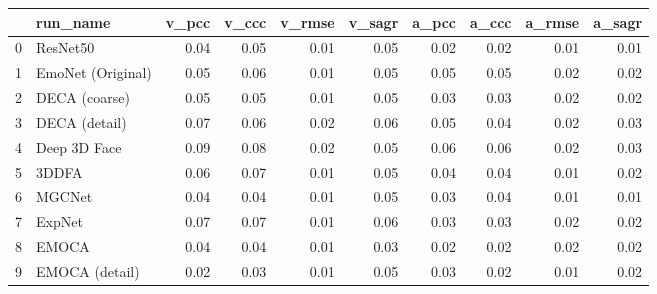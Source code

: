 \begin{tabular}{llrrrrrrrr}
\toprule
{} &           run\_name &  v\_pcc &  v\_ccc &  v\_rmse &  v\_sagr &  a\_pcc &  a\_ccc &  a\_rmse &  a\_sagr \\
\midrule
0 &           ResNet50 &   0.04 &   0.05 &    0.01 &    0.05 &   0.02 &   0.02 &    0.01 &    0.01 \\
1 &  EmoNet (Original) &   0.05 &   0.06 &    0.01 &    0.05 &   0.05 &   0.05 &    0.02 &    0.02 \\
2 &      DECA (coarse) &   0.05 &   0.05 &    0.01 &    0.05 &   0.03 &   0.03 &    0.02 &    0.02 \\
3 &      DECA (detail) &   0.07 &   0.06 &    0.02 &    0.06 &   0.05 &   0.04 &    0.02 &    0.03 \\
4 &       Deep 3D Face &   0.09 &   0.08 &    0.02 &    0.05 &   0.06 &   0.06 &    0.02 &    0.03 \\
5 &              3DDFA &   0.06 &   0.07 &    0.01 &    0.05 &   0.04 &   0.04 &    0.01 &    0.02 \\
6 &             MGCNet &   0.04 &   0.04 &    0.01 &    0.05 &   0.03 &   0.04 &    0.01 &    0.01 \\
7 &             ExpNet &   0.07 &   0.07 &    0.01 &    0.06 &   0.03 &   0.03 &    0.02 &    0.02 \\
8 &              EMOCA &   0.04 &   0.04 &    0.01 &    0.03 &   0.02 &   0.02 &    0.02 &    0.02 \\
9 &     EMOCA (detail) &   0.02 &   0.03 &    0.01 &    0.05 &   0.03 &   0.02 &    0.01 &    0.02 \\
\bottomrule
\end{tabular}
